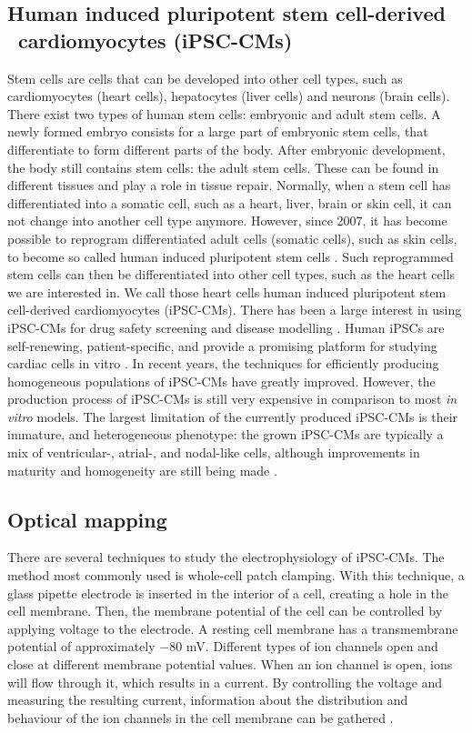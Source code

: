 \documentclass{article}
\begin{document}
\subsection{Human induced pluripotent stem cell-derived \ cardiomyocytes (iPSC-CMs)}
Stem cells are cells that can be developed into other cell types, such as cardiomyocytes (heart cells), hepatocytes (liver cells) and neurons (brain cells). There exist two types of human stem cells: embryonic and adult stem cells. A newly formed embryo consists for a large part of embryonic stem cells, that differentiate to form different parts of the body. After embryonic development, the body still contains stem cells: the adult stem cells. These can be found in different tissues and play a role in tissue repair. Normally, when a stem cell has differentiated into a somatic cell, such as a heart, liver, brain or skin cell, it can not change into another cell type anymore. However, since 2007, it has become possible to reprogram differentiated adult cells (somatic cells), such as skin cells, to become so called human induced pluripotent stem cells \cite{Takahashi2007}. Such reprogrammed stem cells can then be differentiated into other cell types, such as the heart cells we are interested in. We call those heart cells human induced pluripotent stem cell-derived cardiomyocytes (iPSC-CMs). There has been a large interest in using iPSC-CMs for drug safety screening and disease modelling \cite{Sallam2016}. Human iPSCs are self-renewing, patient-specific, and provide a promising platform for studying cardiac cells in vitro \cite{Rajamohan2013}. In recent years, the techniques for efficiently producing homogeneous populations of iPSC-CMs  have greatly improved. However, the production process of iPSC-CMs is still very expensive in comparison to most \textit{in vitro} models. The largest limitation of the currently produced iPSC-CMs is their immature, and heterogeneous phenotype: the grown iPSC-CMs are typically a mix of ventricular-, atrial-, and nodal-like cells, although improvements in maturity and homogeneity are still being made \cite{Denning2016}. 
%
\subsection{Optical mapping}
There are several techniques to study the electrophysiology of iPSC-CMs. The method most commonly used is whole-cell patch clamping. With this technique, a glass pipette electrode is inserted in the interior of a cell, creating a hole in the cell membrane. Then, the membrane potential of the cell can be controlled by applying voltage to the electrode. A resting cell membrane has a transmembrane potential of approximately $-80$ mV. Different types of ion channels open and close at different membrane potential values. When an ion channel is open, ions will flow through it, which results in a current. By controlling the voltage and measuring the resulting current, information about the distribution and behaviour of the ion channels in the cell membrane can be gathered \cite{sakmann2013}. 
\end{document}
